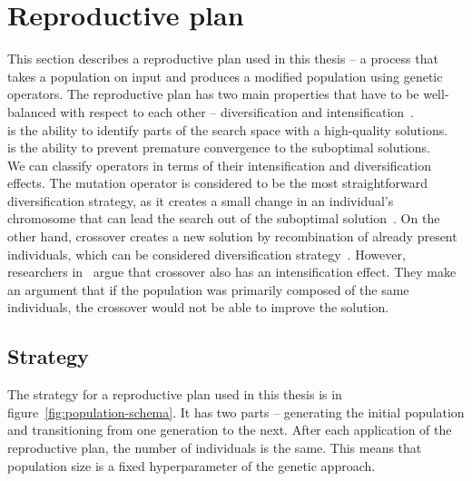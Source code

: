 \newpage


\section{Reproductive plan}\label{sec:reproductive-plan}

This section describes a reproductive plan used in this thesis
– a process that takes a population on input and produces a modified population using genetic operators.
The reproductive plan has two main properties that have to be well-balanced with respect to each other
– diversification and intensification~\cite{blumMetaheuristicsCombinatorialOptimization2003}.\\

 is the ability to identify parts of the search space with a high-quality
solutions.\\

 is the ability to prevent premature convergence to the suboptimal solutions.\\

We can classify operators in terms of their intensification and diversification effects.
The mutation operator is considered to be the most straightforward diversification strategy,
as it creates a small change in an individual's chromosome that can lead the search out of the suboptimal solution~\cite{blumMetaheuristicsCombinatorialOptimization2003}.
On the other hand, crossover creates a new solution by recombination of already present
individuals, which can be considered diversification strategy~\cite{blumMetaheuristicsCombinatorialOptimization2003}.
However, researchers in~\cite{hanshengBalanceExplorationExploitation1999} argue that crossover
also has an intensification effect. They make an argument that if the population was primarily composed of the same individuals, the crossover would not be able to improve the solution.

\subsection{Strategy}\label{subsec:strategy}
The strategy for a reproductive plan used in this thesis is in figure~\ref{fig:population-schema}.
It has two parts – generating the initial population and transitioning from one generation to the next.
After each application of the reproductive plan, the number of individuals is the same.
This means that population size is a fixed hyperparameter of the genetic approach.

